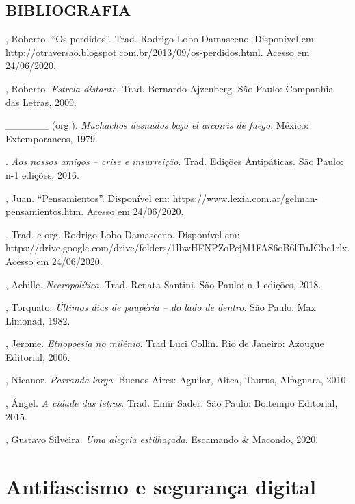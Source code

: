 \section{BIBLIOGRAFIA}

\begin{Parskip}
, Roberto. ``Os perdidos''. Trad. Rodrigo Lobo Damasceno. Disponível
em: http://otraversao.blogspot.com.br/2013/09/os-perdidos.html. Acesso
em 24/06/2020.

, Roberto. \emph{Estrela distante}. Trad. Bernardo Ajzenberg. São
Paulo: Companhia das Letras, 2009.

\_\_\_\_\_\_ (org.). \emph{Muchachos desnudos bajo el arcoiris de fuego}.
México: Extemporaneos, 1979.

. \emph{Aos nossos amigos -- crise e insurreição}. Trad.
Edições Antipáticas. São Paulo: n-1 edições, 2016.

, Juan. ``Pensamientos''. Disponível em:
https://www.lexia.com.ar/gelman-pensamientos.htm. Acesso em 24/06/2020.

. Trad. e org. Rodrigo Lobo Damasceno. Disponível em:
https://drive.google.com/drive/folders/1lbwHFNPZoPejM1FAS6oB6lTuJGbc1rlx.
Acesso em 24/06/2020.

, Achille. \emph{Necropolítica}. Trad. Renata Santini. São Paulo:
n-1 edições, 2018.

, Torquato. \emph{Últimos dias de paupéria -- do lado de dentro}. São
Paulo: Max Limonad, 1982.

, Jerome. \emph{Etnopoesia no milênio}. Trad Luci Collin. Rio
de Janeiro: Azougue Editorial, 2006.

, Nicanor. \emph{Parranda larga}. Buenos Aires: Aguilar, Altea,
Taurus, Alfaguara, 2010.

, Ángel. \emph{A cidade das letras}. Trad. Emir Sader. São Paulo:
Boitempo Editorial, 2015.

, Gustavo Silveira. \emph{Uma alegria estilhaçada}. Escamando \&
Macondo, 2020.
\end{Parskip}

\chapter[Antifascismo e segurança digital]{Antifascismo e segurança digital}

